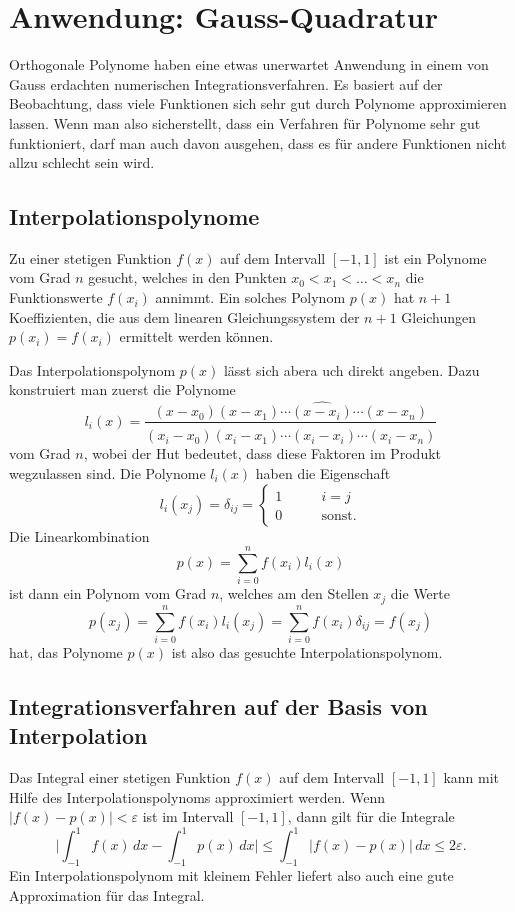%
%
\section{Anwendung: Gauss-Quadratur}
Orthogonale Polynome haben eine etwas unerwartet Anwendung in einem
von Gauss erdachten numerischen Integrationsverfahren.
Es basiert auf der Beobachtung, dass viele Funktionen sich sehr
gut durch Polynome approximieren lassen.
Wenn man also sicherstellt, dass ein Verfahren für Polynome
sehr gut funktioniert, darf man auch davon ausgehen, dass es für
andere Funktionen nicht allzu schlecht sein wird.

\subsection{Interpolationspolynome}
Zu einer stetigen Funktion $f(x)$ auf dem Intervall $[-1,1]$ 
ist ein Polynome vom Grad $n$ gesucht, welches in den Punkten
$x_0<x_1<\dots<x_n$ die Funktionswerte $f(x_i)$ annimmt.
Ein solches Polynom $p(x)$ hat $n+1$ Koeffizienten, die aus dem
linearen Gleichungssystem der $n+1$ Gleichungen $p(x_i)=f(x_i)$ 
ermittelt werden können.

Das Interpolationspolynom $p(x)$ lässt sich abera uch direkt 
angeben.
Dazu konstruiert man zuerst die Polynome
\[
l_i(x)
=
\frac{
(x-x_0)(x-x_1)\cdots\widehat{(x-x_i)}\cdots (x-x_n)
}{
(x_i-x_0)(x_i-x_1)\cdots\widehat{(x_i-x_i)}\cdots (x_i-x_n)
}
\]
vom Grad $n$, wobei der Hut bedeutet, dass diese Faktoren
im Produkt wegzulassen sind.
Die Polynome $l_i(x)$ haben die Eigenschaft
\[
l_i(x_j) = \delta_{ij}
=
\begin{cases}
1&\qquad i=j\\
0&\qquad\text{sonst}.
\end{cases}
\]
Die Linearkombination
\[
p(x) = \sum_{i=0}^n f(x_i)l_i(x)
\]
ist dann ein Polynom vom Grad $n$, welches am den Stellen $x_j$
die Werte
\[
p(x_j) 
=
\sum_{i=0}^n f(x_i)l_i(x_j)
=
\sum_{i=0}^n f(x_i)\delta_{ij}
=
f(x_j)
\]
hat, das Polynome $p(x)$ ist also das gesuchte Interpolationspolynom.

\subsection{Integrationsverfahren auf der Basis von Interpolation}
Das Integral einer stetigen Funktion $f(x)$ auf dem Intervall $[-1,1]$
kann mit Hilfe des Interpolationspolynoms approximiert werden.
Wenn $|f(x)-p(x)|<\varepsilon$ ist im Intervall $[-1,1]$, dann gilt
für die Integrale
\[
\biggl|\int_{-1}^1 f(x)\,dx -\int_{-1}^1p(x)\,dx\biggr|
\le
\int_{-1}^1 |f(x)-p(x)|\,dx
\le
2\varepsilon.
\]
Ein Interpolationspolynom mit kleinem Fehler liefert also auch
eine gute Approximation für das Integral.

